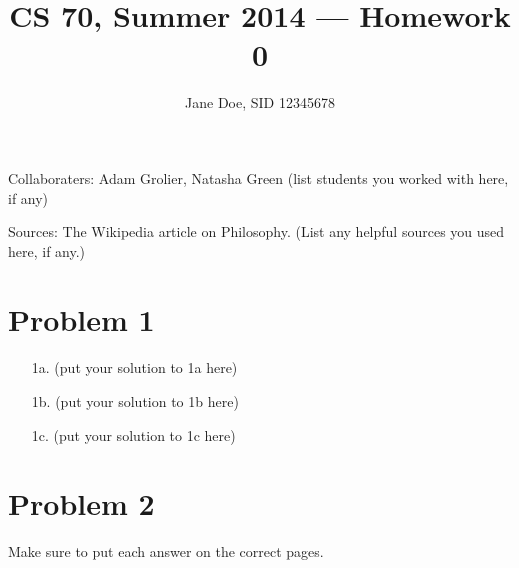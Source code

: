 \documentclass[11pt,letterpaper]{article}
\title{CS 70, Summer 2014 --- Homework 0} %
\author{Jane Doe, SID 12345678} %
\begin{document}
\maketitle

Collaboraters: Adam Grolier, Natasha Green (list students you worked with here, if any)

Sources: The Wikipedia article on Philosophy. (List any helpful sources you used here, if any.)

\section*{Problem 1} %

\begin{enumerate}
\item[1a.] (put your solution to 1a here)

\item[1b.] (put your solution to 1b here)

\item[1c.] (put your solution to 1c here)

\end{enumerate}

\newpage

\section*{Problem 2}

Make sure to put each answer on the correct pages.
\end{document}
